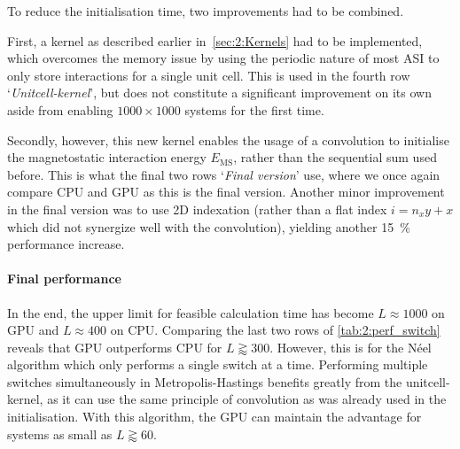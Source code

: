 To reduce the initialisation time, two improvements had to be combined. \par
First, a kernel as described earlier in~\cref{sec:2:Kernels} had to be implemented, which overcomes the memory issue by using the periodic nature of most ASI to only store interactions for a single unit cell.
This is used in the fourth row `\textit{Unitcell-kernel}', but does not constitute a significant improvement on its own aside from enabling $1000 \times 1000$ systems for the first time. \par
Secondly, however, this new kernel enables the usage of a convolution to initialise the magnetostatic interaction energy $E_\mathrm{MS}$, rather than the sequential sum used before.
This is what the final two rows `\textit{Final version}' use, where we once again compare CPU and GPU as this is the final version.
Another minor improvement in the final version was to use 2D indexation (rather than a flat index $i = n_x y + x$ which did not synergize well with the convolution), yielding another \SI{15}{\percent} performance increase.

\paragraph{Final performance}
In the end, the upper limit for feasible calculation time has become $L \approx 1000$ on GPU and $L \approx 400$ on CPU.
Comparing the last two rows of \cref{tab:2:perf_switch} reveals that GPU outperforms CPU for $L \gtrapprox 300$.
However, this is for the N\'eel algorithm which only performs a single switch at a time.
Performing multiple switches simultaneously in Metropolis-Hastings benefits greatly from the unitcell-kernel, as it can use the same principle of convolution as was already used in the initialisation.
With this algorithm, the GPU can maintain the advantage for systems as small as $L \gtrapprox 60$.

